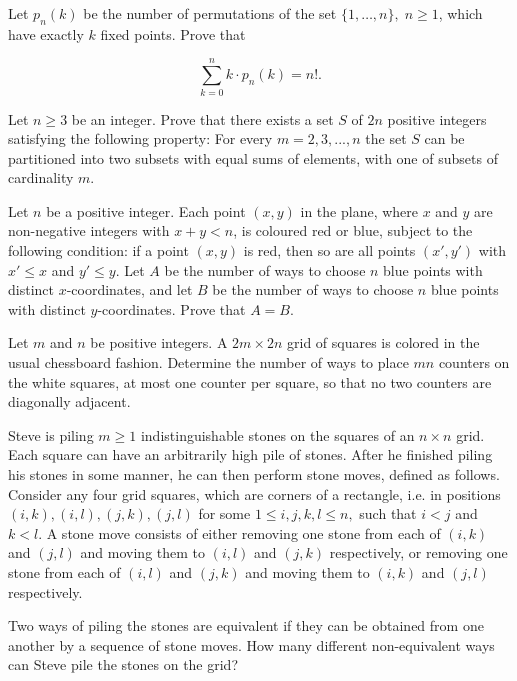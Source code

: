\documentclass{article}
\begin{document}


\begin{req}[IMO 1987/1]{3}
Let $p_n (k)$ be the number of permutations of the set $\{ 1, \ldots , n \} , \; n \ge 1$, which have exactly $k$ fixed points. Prove that

\[\sum_{k=0}^{n} k \cdot p_n (k) = n!.\]
\end{req}

\begin{req}[AIME 1994/11]{6}

\end{req}

\begin{prob}[ISL 2018/C1]{9}
Let $n\geq 3$ be an integer. Prove that there exists a set $S$ of $2n$ positive integers satisfying the following property: For every $m=2,3,...,n$ the set $S$ can be partitioned into two subsets with equal sums of elements, with one of subsets of cardinality $m.$
\end{prob}

\begin{prob}[IMO 2002/1]{9}
Let $n$ be a positive integer. Each point $(x,y)$ in the plane, where $x$ and $y$ are non-negative integers with $x+y<n$, is coloured red or blue, subject to the following condition: if a point $(x,y)$ is red, then so are all points $(x',y')$ with $x'\leq x$ and $y'\leq y$. Let $A$ be the number of ways to choose $n$ blue points with distinct $x$-coordinates, and let $B$ be the number of ways to choose $n$ blue points with distinct $y$-coordinates. Prove that $A=B$.
\end{prob}

\begin{prob}[CMO 2019/3]{13}
Let $m$ and $n$ be positive integers. A $2m\times 2n$ grid of squares is colored in the usual chessboard fashion. Determine the number of ways to place $mn$ counters on the white squares, at most one counter per square, so that no two counters are diagonally adjacent.
\end{prob}

\begin{prob}[USAMO 2015/4]{13}
Steve is piling $m \geq 1$ indistinguishable stones on the squares of an $n \times n$ grid. Each square can have an arbitrarily high pile of stones. After he finished piling his stones in some manner, he can then perform stone moves, defined as follows. Consider any four grid squares, which are corners of a rectangle, i.e. in positions $(i, k),(i, l),(j, k),(j, l)$ for some $1 \leq i, j, k, l \leq n,$ such that $i<j$ and $k<l .$ A stone move consists of either removing one stone from each of $(i, k)$ and $(j, l)$ and moving them to $(i, l)$ and $(j, k)$ respectively, or removing one stone from each of $(i, l)$ and $(j, k)$ and moving them to $(i, k)$ and $(j, l)$ respectively.

Two ways of piling the stones are equivalent if they can be obtained from one another by a sequence of stone moves. How many different non-equivalent ways can Steve pile the stones on the grid?
\end{prob}
\end{document}
